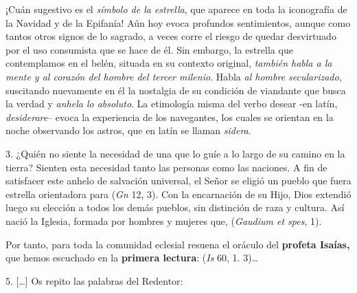 \begin{body}
\begin{body}
¡Cuán sugestivo es el \emph{símbolo de la estrella}, que aparece en toda la iconografía de la Navidad y de la Epifanía! Aún hoy evoca profundos sentimientos, aunque como tantos otros signos de lo sagrado, a veces corre el riesgo de quedar desvirtuado por el uso consumista que se hace de él. Sin embargo, la estrella que contemplamos en el belén, situada en su contexto original, \emph{también habla a la mente y al corazón del hombre del tercer milenio}. Habla \emph{al hombre secularizado}, suscitando nuevamente en él la nostalgia de su condición de viandante que busca la verdad y \emph{anhela lo absoluto}. La etimología misma del verbo desear -en latín, \emph{desiderare}-- evoca la experiencia de los navegantes, los cuales se orientan en la noche observando los astros, que en latín se llaman \emph{sidera}.

3. ¿Quién no siente la necesidad de una  que lo guíe a lo largo de su camino en la tierra? Sienten esta necesidad tanto las personas como las naciones. A fin de satisfacer este anhelo de salvación universal, el Señor se eligió un pueblo que fuera estrella orientadora para  (\emph{Gn} 12, 3). Con la encarnación de su Hijo, Dios extendió luego su elección a todos los demás pueblos, sin distinción de raza y cultura. Así nació la Iglesia, formada por hombres y mujeres que,  (\emph{Gaudium et spes}, 1).

Por tanto, para toda la comunidad eclesial resuena el oráculo del \textbf{profeta Isaías,} que hemos escuchado en la \textbf{primera lectura}:  (\emph{Is} 60, 1. 3)\ldots{}

5. {[}\ldots{}{]} Os repito las palabras del Redentor: 
\end{body}
\end{body}
